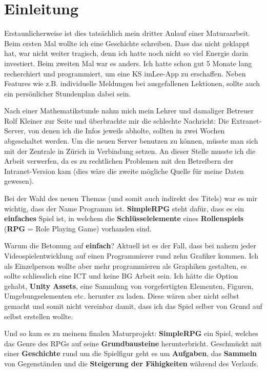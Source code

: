 \chapter{Einleitung}

Erstaunlicherweise ist dies tatsächlich mein dritter Anlauf einer Maturaarbeit.
Beim ersten Mal wollte ich eine Geschichte schreiben.
Dass das nicht geklappt hat, war nicht weiter tragisch, denn ich hatte noch nicht so viel Energie darin investiert.
Beim zweiten Mal war es anders.
Ich hatte schon gut 5 Monate lang recherchiert und programmiert, um eine KS imLee-App zu erschaffen.
Neben Features wie z.B. individuelle Meldungen bei ausgefallenen Lektionen, sollte auch ein persönlicher Stundenplan dabei sein. 

\smallskip
Nach einer Mathematikstunde nahm mich mein Lehrer und damaliger Betreuer Rolf Kleiner zur Seite und überbrachte mir die schlechte Nachricht: Die Extranet-Server, von denen ich die Infos jeweils abholte, sollten in zwei Wochen abgeschaltet werden. Um die neuen Server benutzen zu können, müsste man sich mit der Zentrale in Zürich in Verbindung setzen.
An dieser Stelle musste ich die Arbeit verwerfen, da es zu rechtlichen Problemen mit den Betreibern der Intranet-Version kam (dies wäre die zweite mögliche Quelle für meine Daten gewesen).

\smallskip
Bei der Wahl des neuen Themas (und somit auch indirekt des Titels) war es mir wichtig, dass der Name Programm ist.
\textbf{SimpleRPG} steht dafür, dass es ein \textbf{einfaches} Spiel ist, in welchem die \textbf{Schlüsselelemente} eines \textbf{Rollenspiels} (\textbf{RPG} = Role Playing Game) vorhanden sind.

\smallskip
Warum die Betonung auf \textbf{einfach}? Aktuell ist es der Fall, dass bei nahezu jeder Videospielentwicklung auf einen Programmierer rund zehn Grafiker kommen.
Ich als Einzelperson wollte aber mehr programmieren als Graphiken gestalten, es sollte schliesslich eine ICT und keine BG Arbeit sein.
Ich hätte die Option gehabt, \textbf{Unity Assets}, eine Sammlung von vorgefertigten Elementen, Figuren, Umgebungselementen etc. herunter zu laden.
Diese wären aber nicht selbst gemacht und somit nicht vereinbar damit, dass ich das Spiel selber von Grund auf selbst erstellen wollte.

\smallskip
Und so kam es zu meinem finalen Maturprojekt: \textbf{SimpleRPG} ein Spiel, welches das Genre des RPGs auf seine \textbf{Grundbausteine} herunterbricht. Geschmückt mit einer \textbf{Geschichte} rund um die Spielfigur geht es um \textbf{Aufgaben}, das \textbf{Sammeln} von Gegenständen und die \textbf{Steigerung der Fähigkeiten} während des Verlaufs. 



